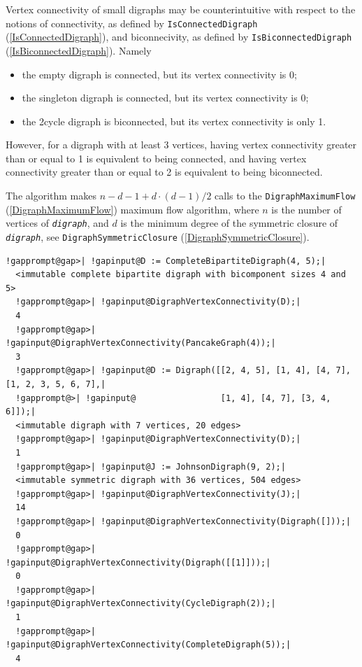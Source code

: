 \documentclass[a4paper,11pt]{report}
\begin{document}
{{{ Vertex connectivity of small digraphs may be counterintuitive with respect to
the notions of connectivity, as defined by \texttt{IsConnectedDigraph} (\ref{IsConnectedDigraph}), and biconnecivity, as defined by \texttt{IsBiconnectedDigraph} (\ref{IsBiconnectedDigraph}). Namely 
\begin{itemize}
\item  the empty digraph is connected, but its vertex connectivity is 0; 
\item  the singleton digraph is connected, but its vertex connectivity is 0;
\item  the 2\texttt{}cycle digraph is biconnected, but its vertex
connectivity is only 1.
\end{itemize}
 However, for a digraph with at least 3 vertices, having vertex connectivity
greater than or equal to 1 is equivalent to being connected, and having vertex
connectivity greater than or equal to 2 is equivalent to being biconnected. 

 The algorithm makes $n - d - 1 + d \cdot (d - 1) / 2$ calls to the \texttt{DigraphMaximumFlow} (\ref{DigraphMaximumFlow}) maximum flow algorithm, where $n$ is the number of vertices of \mbox{\texttt{\mdseries\slshape digraph}}, and $d$ is the minimum degree of the symmetric closure of \mbox{\texttt{\mdseries\slshape digraph}}, see \texttt{DigraphSymmetricClosure} (\ref{DigraphSymmetricClosure}). 
\begin{Verbatim}[commandchars=!@|,fontsize=\small,frame=single,label=Example]
  !gapprompt@gap>| !gapinput@D := CompleteBipartiteDigraph(4, 5);|
  <immutable complete bipartite digraph with bicomponent sizes 4 and 5>
  !gapprompt@gap>| !gapinput@DigraphVertexConnectivity(D);|
  4
  !gapprompt@gap>| !gapinput@DigraphVertexConnectivity(PancakeGraph(4));|
  3
  !gapprompt@gap>| !gapinput@D := Digraph([[2, 4, 5], [1, 4], [4, 7], [1, 2, 3, 5, 6, 7],|
  !gapprompt@>| !gapinput@                 [1, 4], [4, 7], [3, 4, 6]]);|
  <immutable digraph with 7 vertices, 20 edges>
  !gapprompt@gap>| !gapinput@DigraphVertexConnectivity(D);|
  1
  !gapprompt@gap>| !gapinput@J := JohnsonDigraph(9, 2);|
  <immutable symmetric digraph with 36 vertices, 504 edges>
  !gapprompt@gap>| !gapinput@DigraphVertexConnectivity(J);|
  14
  !gapprompt@gap>| !gapinput@DigraphVertexConnectivity(Digraph([]));|
  0
  !gapprompt@gap>| !gapinput@DigraphVertexConnectivity(Digraph([[1]]));|
  0
  !gapprompt@gap>| !gapinput@DigraphVertexConnectivity(CycleDigraph(2));|
  1
  !gapprompt@gap>| !gapinput@DigraphVertexConnectivity(CompleteDigraph(5));|
  4
\end{Verbatim}
 }

}}
\end{document}
